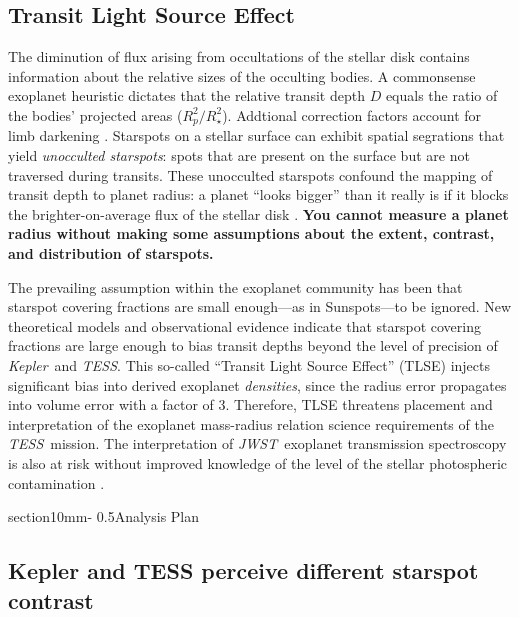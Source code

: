 \documentclass[letterpaper,11pt]{article}
\makeatletter
\renewcommand{\section}{\@startsection%
{section}{1}{0mm}{-\baselineskip}%
{0.5\baselineskip}{\normalfont\Large\bfseries}}%
\newcommand{\tess}{{\it TESS}}
\newcommand{\jwst}{{\it JWST}}
\newcommand{\kepler}{{\it Kepler}}
\makeatother
\begin{document}
\subsection{Transit Light Source Effect}
The diminution of flux arising from occultations of the stellar disk contains information about the relative sizes of the occulting bodies.  A commonsense exoplanet heuristic dictates that the relative transit depth $D$ equals the ratio of the bodies' projected areas ($R_p^2/R_\star^2$).  Addtional correction factors account for limb darkening \citep{2002ApJ...580L.171M}.  Starspots on a stellar surface can exhibit spatial segrations %
that yield \emph{unocculted starspots}: spots that are present on the surface but are not traversed during transits.  These unocculted starspots confound the mapping of transit depth to planet radius: a planet ``looks bigger'' than it really is if it blocks the brighter-on-average flux of the stellar disk \citep{2018AJ....156...91M}.  \textbf{You cannot measure a planet radius without making some assumptions about the extent, contrast, and distribution of starspots.}

The prevailing assumption within the exoplanet community has been that starspot covering fractions are small enough---as in Sunspots---to be ignored.  New theoretical models \citep{2018ApJ...853..122R} and observational evidence \citep{2016MNRAS.463.2494F} indicate that starspot covering fractions are large enough to bias transit depths beyond the level of precision of \kepler\ and \tess.  This so-called ``Transit Light Source Effect'' (TLSE) injects significant bias into derived exoplanet \emph{densities}, since the radius error propagates into volume error with a factor of 3.  Therefore, TLSE threatens placement and interpretation of the exoplanet mass-radius relation science requirements of the \tess\ mission.  The interpretation of \jwst\ exoplanet transmission spectroscopy is also at risk without improved knowledge of the level of the stellar photospheric contamination \citep{2019AJ....157...11W}.

\section{Analysis Plan}

\subsection{Kepler and TESS perceive different starspot contrast}
\end{document}
